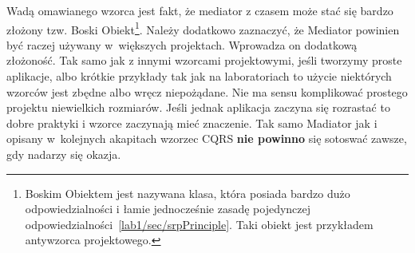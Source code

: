 Wadą omawianego wzorca jest fakt, że mediator z czasem może stać się bardzo złożony tzw. Boski Obiekt\footnote{Boskim Obiektem jest nazywana klasa, która posiada bardzo dużo odpowiedzialności i łamie jednocześnie zasadę pojedynczej odpowiedzialności~\ref{lab1/sec/srpPrinciple}. Taki obiekt jest przykładem antywzorca projektowego.}. Należy dodatkowo zaznaczyć, że Mediator powinien być raczej używany w~większych projektach. Wprowadza on dodatkową złożoność. Tak samo jak z innymi wzorcami projektowymi, jeśli tworzymy proste aplikacje, albo krótkie przykłady tak jak na laboratoriach to użycie niektórych wzorców jest zbędne albo wręcz niepożądane. Nie ma sensu komplikować prostego projektu niewielkich rozmiarów.
Jeśli jednak aplikacja zaczyna się rozrastać to dobre praktyki i wzorce zaczynają mieć znaczenie. %
Tak samo Madiator jak i opisany w~kolejnych akapitach wzorzec CQRS \textbf{nie powinno} się sotoswać zawsze, gdy nadarzy się okazja.

